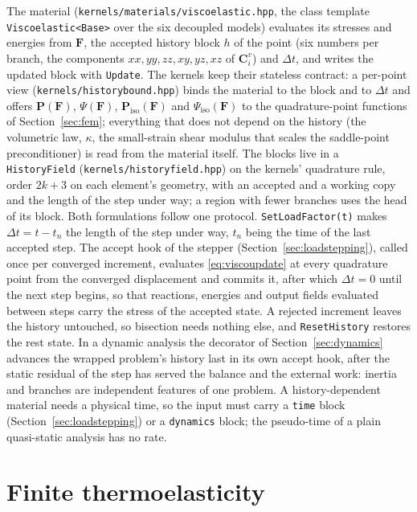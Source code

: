 \documentclass[11pt]{article}
\newcommand{\bP}{\bm{P}}
\newcommand{\bF}{\bm{F}}
\newcommand{\bC}{\bm{C}}
\DeclareRobustCommand{\code}[1]{{\def\_{\textunderscore\allowbreak}\texttt{#1}}}
\DeclareRobustCommand{\file}[1]{{\def\_{\textunderscore\allowbreak}\texttt{#1}}}
\begin{document}
The material (\file{kernels/materials/viscoelastic.hpp}, the class template
\code{Viscoelastic<Base>} over the six decoupled models) evaluates its
stresses and energies from $\bF$, the accepted history block $h$ of the
point (six numbers per branch, the components $xx, yy, zz, xy, yz, xz$ of
$\bC^v_i$) and $\Delta t$, and writes the updated block with \code{Update}.
The kernels keep their stateless contract: a per-point view
(\file{kernels/history\_bound.hpp}) binds the material to the block and to
$\Delta t$ and offers $\bP(\bF)$, $\Psi(\bF)$, $\bP_{\mathrm{iso}}(\bF)$
and $\Psi_{\mathrm{iso}}(\bF)$ to the quadrature-point functions of
Section~\ref{sec:fem}; everything that does not depend on the history
(the volumetric law, $\kappa$, the small-strain shear modulus that scales
the saddle-point preconditioner) is read from the material itself.  The
blocks live in a \code{HistoryField} (\file{kernels/history\_field.hpp}) on
the kernels' quadrature rule, order $2k + 3$ on each element's geometry,
with an accepted and a working copy and the length of the step under way;
a region with fewer branches uses the head of its block.  Both formulations
follow one protocol.  \code{SetLoadFactor(t)} makes $\Delta t = t - t_n$
the length of the step under way, $t_n$ being the time of the last accepted
step.  The accept hook of the stepper (Section~\ref{sec:loadstepping}),
called once per converged increment, evaluates \eqref{eq:viscoupdate} at
every quadrature point from the converged displacement and commits it,
after which $\Delta t = 0$ until the next step begins, so that reactions,
energies and output fields evaluated between steps carry the stress of the
accepted state.  A rejected increment leaves the history untouched, so
bisection needs nothing else, and \code{ResetHistory} restores the rest
state.  In a dynamic analysis the decorator of Section~\ref{sec:dynamics}
advances the wrapped problem's history last in its own accept hook, after
the static residual of the step has served the balance and the external
work: inertia and branches are independent features of one problem.  A
history-dependent material needs a physical time, so the input must carry a
\code{time} block (Section~\ref{sec:loadstepping}) or a \code{dynamics}
block; the pseudo-time of a plain quasi-static analysis has no rate.

\section{Finite thermoelasticity}
\label{sec:thermoelasticity}
\end{document}
